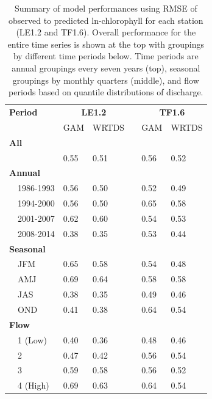 \documentclass[letterpaper,12pt,oneside]{article}\usepackage[]{graphicx}\usepackage[]{color}
\begin{document}
\begin{table}[!tbp]
\caption{Summary of model performances using \ac{RMSE} of observed to predicted ln-chlorophyll for each station (LE1.2 and TF1.6).  Overall performance for the entire time series is shown at the top with groupings by different time periods below.  Time periods are annual groupings every seven years (top), seasonal groupings by monthly quarters (middle), and flow periods based on quantile distributions of discharge.\label{tab:perftoobs}} 
\begin{center}
\begin{tabular}{lllcll}
\hline\hline
\multicolumn{1}{l}{\bfseries Period}&\multicolumn{2}{c}{\bfseries LE1.2}&\multicolumn{1}{c}{\bfseries }&\multicolumn{2}{c}{\bfseries TF1.6}\tabularnewline
\cline{2-3} \cline{5-6}
\multicolumn{1}{l}{}&\multicolumn{1}{c}{GAM}&\multicolumn{1}{c}{WRTDS}&\multicolumn{1}{c}{}&\multicolumn{1}{c}{GAM}&\multicolumn{1}{c}{WRTDS}\tabularnewline
\hline
{\bfseries All}&&&&&\tabularnewline
~~&0.55&0.51&&0.56&0.52\tabularnewline
\hline
{\bfseries Annual}&&&&&\tabularnewline
~~1986-1993&0.56&0.50&&0.52&0.49\tabularnewline
~~1994-2000&0.56&0.50&&0.65&0.58\tabularnewline
~~2001-2007&0.62&0.60&&0.54&0.53\tabularnewline
~~2008-2014&0.38&0.35&&0.53&0.44\tabularnewline
\hline
{\bfseries Seasonal}&&&&&\tabularnewline
~~JFM&0.65&0.58&&0.54&0.48\tabularnewline
~~AMJ&0.69&0.64&&0.58&0.58\tabularnewline
~~JAS&0.38&0.35&&0.49&0.46\tabularnewline
~~OND&0.41&0.38&&0.64&0.54\tabularnewline
\hline
{\bfseries Flow}&&&&&\tabularnewline
~~1 (Low)&0.40&0.36&&0.48&0.46\tabularnewline
~~2&0.47&0.42&&0.56&0.54\tabularnewline
~~3&0.59&0.58&&0.56&0.52\tabularnewline
~~4 (High)&0.69&0.63&&0.64&0.54\tabularnewline
\hline
\end{tabular}\end{center}

\end{table}
\end{document}

